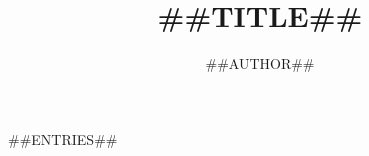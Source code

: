 
\renewcommand{\startEntry}[1][]{} %
\renewcommand{\finishEntry}[1][]{} %



\author{##AUTHOR##}
\title{##TITLE##}
\maketitle
\tableofcontents

##ENTRIES##


